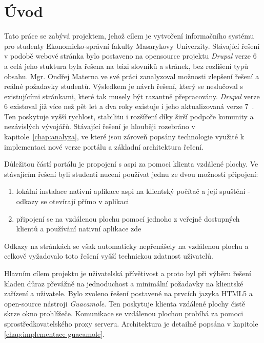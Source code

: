 \chapter{Úvod}
Tato práce se zabývá projektem, jehož cílem je vytvoření informačního systému pro studenty Ekonomicko-správní fakulty Masarykovy Univerzity. Stávající řešení v podobě webové stránka bylo postaveno na \gls{opensource} projektu \emph{Drupal} verze 6 a celá jeho stuktura byla řešena na bázi slovníků a stránek, bez rozlišení typů obsahu. Mgr. Ondřej Materna ve své práci zanalyzoval možnosti zlepšení řešení a reálné požadavky studentů. Výsledkem je návrh řešení, který se neslučoval s existujícími stránkami, které tak musely být razantně přepracovány. \emph{Drupal} verze 6 existoval již více než pět let a dva roky existuje i jeho aktualizovaná verze 7~\cite{website:wiki:drupal}. Ten poskytuje vyšší rychlost, stabilitu i rozšíření díky širší podpoře komunity a nezávislých vývojářů. Stávající řešení je hlouběji rozebráno v kapitole~\ref{chap:analyza}, ve které jsou zároveň popsány technologie využité k implementaci nové verze portálu a základní architektura řešení.

Důležitou částí portálu je propojení s \gls{aspi} za pomoci klienta vzdálené plochy. Ve stávajícím řešení byli studenti nuceni používat jednu ze dvou možností připojení:

\begin{enumerate}
  \item lokální instalace nativní aplikace \gls{aspi} na klientský počítač a  její spuštění - odkazy se otevírají přímo v aplikaci
  \item připojení se na vzdálenou plochu pomocí jednoho z veřejně dostupných klientů a používání nativní aplikace zde
\end{enumerate}

Odkazy na stránkách se však automaticky nepřenášely na vzdálenou plochu a celkově vyžadovalo toto řešení vyšší technickou zdatnost uživatelů.

Hlavním cílem projektu je uživatelská přívětivost a proto byl při výběru řešení kladen důraz převážně na jednoduchost a minimální požadavky na klientské zařízení a uživatele. Bylo zvoleno řešení postavené na prvcích jazyka HTML5 a open-source nástroji \emph{Guacamole}. Ten poskytuje klienta vzdálené plochy čistě skrze okno prohlížeče. Komunikace se vzdálenou plochou probíhá za pomoci sprostředkovatelského proxy serveru. Architektura je detailně popsána v kapitole \ref{chap:implementace-guacamole}.

